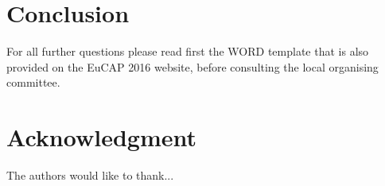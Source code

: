 \documentclass{article}
\begin{document}
%




\vspace{7pt}
\section{Conclusion}
For all further questions please read first the WORD template that is also provided on the EuCAP 2016 website, before consulting the local organising committee.






\vspace{7pt}
\section*{Acknowledgment}


The authors would like to thank...
\end{document}
